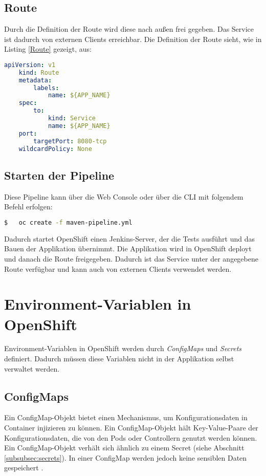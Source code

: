 \subsection{Route}
Durch die Definition der Route wird diese nach außen frei gegeben. Das Service ist dadurch von externen Clients erreichbar. Die Definition der Route sieht, wie in Listing \ref{Route} gezeigt, aus:

\begin{lstlisting}[language=yml, caption=maven-pipeline.yml - Service, label=Route]
	apiVersion: v1
	kind: Route
	metadata:
		labels:
			name: ${APP_NAME}
	spec:
		to:
			kind: Service
			name: ${APP_NAME}
	port:
		targetPort: 8080-tcp
	wildcardPolicy: None
\end{lstlisting}

\subsection{Starten der Pipeline}
Diese Pipeline kann über die Web Console oder über die CLI mit folgendem Befehl erfolgen:
\begin{lstlisting}[language=bash]
$	oc create -f maven-pipeline.yml
\end{lstlisting}

Dadurch startet OpenShift einen Jenkins-Server, der die Tests ausführt und das Bauen der Applikation übernimmt. Die Applikation wird in OpenShift deployt und danach die Route freigegeben. Dadurch ist das Service unter der angegebene Route verfügbar und kann auch von externen Clients verwendet werden.


\section{Environment-Variablen in OpenShift}
Environment-Variablen in OpenShift werden durch \textit{ConfigMaps} und \textit{Secrets} definiert. Dadurch müssen diese Variablen nicht in der Applikation selbst verwaltet werden.

\subsection{ConfigMaps}
Ein ConfigMap-Objekt bietet einen Mechanismus, um Konfigurationsdaten in Container injizieren zu können. Ein ConfigMap-Objekt hält Key-Value-Paare der Konfigurationsdaten, die von den Pods oder Controllern genutzt werden können. Ein ConfigMap-Objekt verhält sich ähnlich zu einem Secret (siehe Abschnitt \ref{subsubsec:secrets}). In einer ConfigMap werden jedoch keine sensiblen Daten gespeichert \cite{OpenShiftOnline}.

